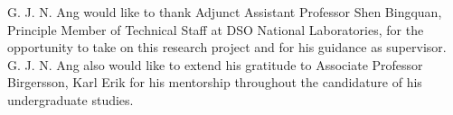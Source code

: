 \begin{acknowledgments}
G. J. N. Ang would like to thank Adjunct Assistant Professor Shen Bingquan, Principle Member of Technical Staff at DSO National Laboratories, for the opportunity to take on this research project and for his guidance as supervisor. G. J. N. Ang also would like to extend his gratitude to Associate Professor Birgersson, Karl Erik for his mentorship throughout the candidature of his undergraduate studies.
\end{acknowledgments}